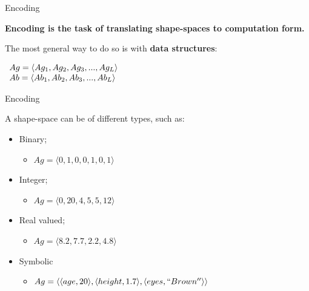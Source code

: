 \documentclass[xcolor=svgnames]{beamer}
\begin{document}
		\begin{frame}{Encoding}
            
            \textbf{Encoding is the task of translating shape-spaces to computation form.}
            
            \vspace{1em}
            The most general way to do so is with \textbf{data structures}:
            
            \vspace{0.5em}
        	
			\begin{center}
				$\begin{array}{ll}
					Ag = \langle Ag_1,Ag_2,Ag_3,...,Ag_L \rangle \cr
					Ab = \langle Ab_1,Ab_2,Ab_3,...,Ab_L \rangle \cr
                 \end{array}$
            \end{center}            
		\end{frame}
        
        \begin{frame}{Encoding}
            
            \vspace{0.5em}
            
            A shape-space can be of different types, such as:
            
            \vspace{0.5em}
            
            \begin{itemize}
            	\item Binary;
                \begin{itemize}
					\item $Ag = \langle 0,1,0,0,1,0,1 \rangle$
				\end{itemize}
                \vspace{0.3em}
				\item Integer;
               	\begin{itemize}
					\item $Ag = \langle 0, 20, 4, 5, 5, 12 \rangle$
				\end{itemize}
                \vspace{0.3em}                
                \item Real valued;
                \begin{itemize}
					\item $Ag = \langle 8.2, 7.7, 2.2, 4.8 \rangle$
				\end{itemize}
                \item Symbolic
                \begin{itemize}
					\item $Ag = \langle \langle age, 20 \rangle, \langle height, 1.7\rangle , \langle eyes,``Brown''\rangle \rangle$
				\end{itemize}
			\end{itemize}
            
		\end{frame}
        
\end{document}
